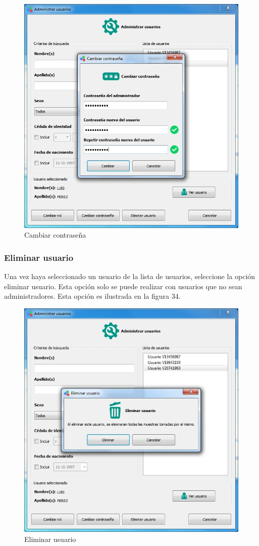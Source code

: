 \begin{figure}[H]
  \centering
  \includegraphics[width=1\linewidth]{./img/administrar-clave.jpg}
\caption{Cambiar contrase\~{n}a}
\end{figure}
		
		\subsubsection{Eliminar usuario}
		
		Una vez haya seleccionado un usuario de la lista de usuarios, seleccione la opci\'{o}n eliminar usuario. Esta opci\'{o}n solo se puede realizar con usuarios que no sean administradores. Esta opci\'{o}n es ilustrada en la figura 34.
		
\begin{figure}[H]
  \centering
  \includegraphics[width=1\linewidth]{./img/administrar-eliminar.jpg}
\caption{Eliminar usuario}
\end{figure}
